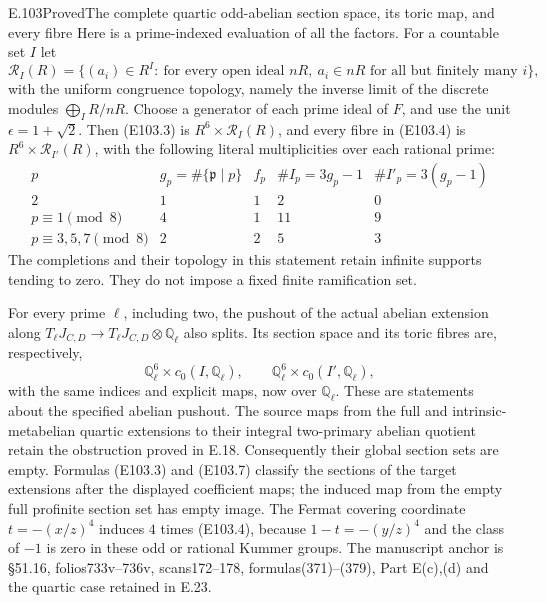 \begin{statement}{E.103}{Proved}{The complete quartic odd-abelian section space, its toric map, and every fibre}
Here is a prime-indexed evaluation of all the factors.  For a
countable set $I$ let
\[
 \mathcal R_I(R)=
 \{(a_i)\in R^I:\ \text{for every open ideal }nR,
              \ a_i\in nR\text{ for all but finitely many }i\},
 \tag{E103.5}
\]
with the uniform congruence topology, namely the inverse limit of
the discrete modules $\bigoplus_I R/nR$.
Choose a generator of each prime ideal of $F$, and use the unit
$\epsilon=1+\sqrt2$.  Then (E103.3) is $R^6\times\mathcal R_I(R)$,
and every fibre in (E103.4) is $R^6\times\mathcal R_{I'}(R)$, with
the following literal multiplicities over each rational prime:
\[
\begin{array}{c|c|c|c|c}
 p&g_p=\#\{\mathfrak p\mid p\}&f_p&
       \# I_p=3g_p-1&\# I'_p=3(g_p-1)\\ \hline
 2&1&1&2&0\\
 p\equiv1\pmod8&4&1&11&9\\
 p\equiv3,5,7\pmod8&2&2&5&3
\end{array}
 \tag{E103.6}
\]
The completions and their topology in this statement retain
infinite supports tending to zero.  They do not impose a fixed
finite ramification set.

For every prime $\ell$, including two, the pushout of the actual
abelian extension along
$T_\ell J_{C,D}\to T_\ell J_{C,D}\otimes\mathbb Q_\ell$
also splits.  Its section space and its toric fibres are, respectively,
\[
 \mathbb Q_\ell^6\times c_0(I,\mathbb Q_\ell),\qquad
 \mathbb Q_\ell^6\times c_0(I',\mathbb Q_\ell),
 \tag{E103.7}
\]
with the same indices and explicit maps, now over $\mathbb Q_\ell$.
These are statements about the specified abelian pushout.
The source maps from the full and intrinsic-metabelian quartic
extensions to their integral two-primary abelian quotient retain
the obstruction proved in E.18.  Consequently their global
section sets are empty.  Formulas (E103.3) and (E103.7) classify
the sections of the target extensions after the displayed
coefficient maps; the induced map from the empty full
profinite section set has empty image.
The Fermat covering coordinate $t=-(x/z)^4$ induces $4$ times
(E103.4), because $1-t=-(y/z)^4$ and the class of $-1$ is zero
in these odd or rational Kummer groups.
The manuscript anchor is \S51.16, folios733v--736v,
scans172--178, formulas(371)--(379), Part E(c),(d) and
the quartic case retained in E.23.
\end{statement}
